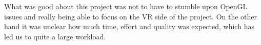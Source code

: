 \documentclass[paper=a4, fontsize=11pt]{scrartcl} %
\numberwithin{equation}{section} %
\numberwithin{figure}{section} %
\numberwithin{table}{section} %
\begin{document}
What was good about this project was not to have to stumble upon OpenGL issues and really being able to focus on the VR side of the project. On the other hand it was unclear how much time, effort and quality was expected, which has led us to quite a large workload.

\end{document}
